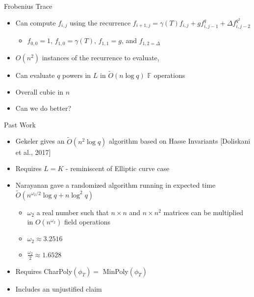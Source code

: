\documentclass{beamer}
\newcommand{\ot}{\widetilde{O}}
\begin{document}
\begin{frame}{Frobenius Trace}
\begin{itemize}
\item Can compute $f_{i,j}$ using the recurrence $f_{i+1,j} = \gamma(T) f_{i,j} + g f_{i,j-1}^q + \Delta f_{i,j-2}^{q^2}$
\begin{itemize}
    \item $f_{0,0} = 1$, $f_{1,0} = \gamma(T)$, $f_{1,1} = g$, and $f_{1,2 = \Delta}$
\end{itemize}
\item $O(n^2)$ instances of the recurrence to evaluate,

\item Can evaluate $q$ powers in $L$ in $\ot(n \log q)$ $\mathbb{F}$ operations
\item Overall cubic in $n$
\item Can we do better?
\end{itemize}
\end{frame}


\begin{frame}{Past Work}
    \begin{itemize}
        \item Gekeler gives an $\ot(n^2 \log q)$ algorithm based on Hasse Invariants [Doliskani et al., 2017]
        \item Requires $L = K$ - reminiscent of Elliptic curve case
        \[\]
        \item Narayanan gave a randomized algorithm running in expected time $\ot(n^{\omega_2/2} \log q + n \log^2 q)$
        \begin{itemize}
            \item $\omega_2$ a real number such that $n \times n$ and $n \times n^2$ matrices can be multiplied in $O(n^{\omega_2})$ field operations
            \item $\omega_2 \approx 3.2516$
            \item $\frac{\omega_2}{2} \approx 1.6528$
        \end{itemize}
        \item Requires CharPoly$(\phi_T) = $ MinPoly$(\phi_T)$
        \item Includes an unjustified claim
    \end{itemize}
\end{frame}

\end{document}
